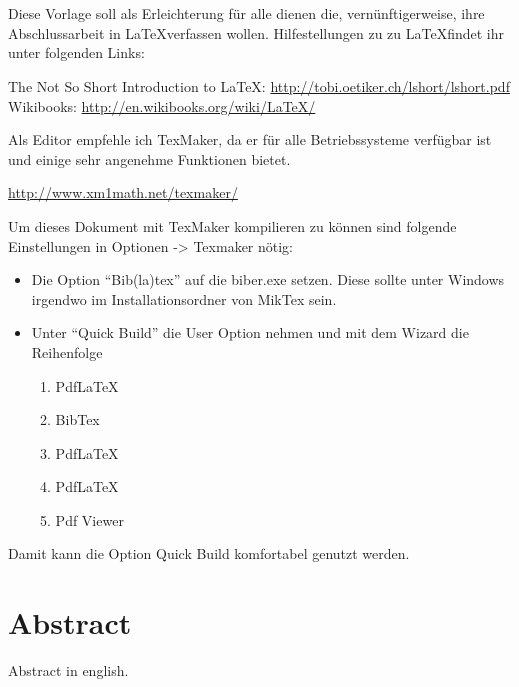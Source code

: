 \chapter*{\abstractname} %
Diese Vorlage soll als Erleichterung für alle dienen die, vernünftigerweise, ihre Abschlussarbeit in \LaTeX verfassen wollen. Hilfestellungen zu zu \LaTeX findet ihr unter folgenden Links:

\begin{center}
The Not So Short Introduction to \LaTeX: \url{http://tobi.oetiker.ch/lshort/lshort.pdf} \\
Wikibooks: \url{http://en.wikibooks.org/wiki/LaTeX/}
\end{center}

Als Editor empfehle ich TexMaker, da er für alle Betriebssysteme verfügbar ist und einige sehr angenehme Funktionen bietet.
\begin{center}\url{http://www.xm1math.net/texmaker/}\end{center}

Um dieses Dokument mit TexMaker kompilieren zu können sind folgende Einstellungen in Optionen -> Texmaker nötig:
\begin{itemize}
\item Die Option \enquote{Bib(la)tex} auf die biber.exe setzen. Diese sollte unter Windows irgendwo im Installationsordner von MikTex sein.
\item Unter \enquote{Quick Build} die User Option nehmen und mit dem Wizard die Reihenfolge
	\begin{enumerate}
	\item PdfLaTeX
	\item BibTex
	\item PdfLaTeX
	\item PdfLaTeX
	\item Pdf Viewer	
	\end{enumerate}
\end{itemize}
Damit kann die Option Quick Build komfortabel genutzt werden.

\let\oldcleardoublepage\cleardoublepage
\renewcommand\cleardoublepage{}

\chapter*{Abstract}
Abstract in english.

\let\cleardoublepage\oldcleardoublepage
\newpage
